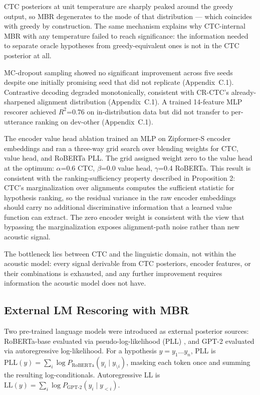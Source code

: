 CTC posteriors at unit temperature are sharply peaked around the greedy output, so MBR degenerates to the mode of that distribution — which coincides with greedy by construction. The same mechanism explains why CTC-internal MBR with any temperature failed to reach significance: the information needed to separate oracle hypotheses from greedy-equivalent ones is not in the CTC posterior at all.

MC-dropout sampling showed no significant improvement across five seeds despite one initially promising seed that did not replicate (Appendix~C.1). Contrastive decoding degraded monotonically, consistent with CR-CTC's already-sharpened alignment distribution (Appendix~C.1). A trained 14-feature MLP rescorer achieved $R^2$=0.76 on in-distribution data but did not transfer to per-utterance ranking on dev-other (Appendix~C.1).

The encoder value head ablation trained an MLP on Zipformer-S encoder embeddings and ran a
three-way grid search over blending weights for CTC, value head, and RoBERTa PLL. The grid assigned
weight zero to the value head at the optimum: $\alpha$=0.6 CTC, $\beta$=0.0 value head, $\gamma$=0.4
RoBERTa. This result is consistent with the ranking-sufficiency property described in Proposition 2: CTC's
marginalization over alignments computes the sufficient statistic for hypothesis ranking, so the
residual variance in the raw encoder embeddings should carry no additional discriminative information
that a learned value function can extract. The zero encoder weight is consistent with the view that bypassing the marginalization exposes alignment-path noise rather than new acoustic signal.

The bottleneck lies between CTC and the linguistic domain, not within the acoustic model: every signal derivable from CTC posteriors, encoder features, or their combinations is exhausted, and any further improvement requires information the acoustic model does not have.



\subsection{External LM Rescoring with MBR}

Two pre-trained language models were introduced as external posterior sources: RoBERTa-base
\cite{liu2019roberta} evaluated via pseudo-log-likelihood (PLL) \cite{salazar2020pll}, and GPT-2
\cite{radford2019gpt2} evaluated via autoregressive log-likelihood. For a hypothesis
$y = y_1 \ldots y_n$, PLL is $\text{PLL}(y) = \sum_i \log P_{\text{RoBERTa}}(y_i \mid y_{\setminus
i})$, masking each token once and summing the resulting log-conditionals. Autoregressive LL is
$\text{LL}(y) = \sum_i \log P_{\text{GPT-2}}(y_i \mid y_{<i})$.


